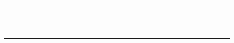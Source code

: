 \documentclass[10pt]{article}
\begin{document}
\begin{center}
\begin{tabular}{|c|c|c|c|c|c|c|c|c|c|c|c|c|c|c|c|c|c|c|c|c|c|c|c|c|c|c|c|c|c|c|c|}
\hline
 &  &  &  &  &  &  &  &  &  &  &  &  &  &  &  &  &  &  &  &  &  &  &  &  &  &  &  &  &  &  &  \\
\hline
 &  &  &  &  &  &  &  &  &  &  &  &  &  &  &  &  &  &  &  &  &  &  &  &  &  &  &  &  &  &  &  \\
\hline
 &  &  &  &  &  &  &  &  &  &  &  &  &  &  &  &  &  &  &  &  &  &  &  &  &  &  &  &  &  &  &  \\
\hline
 &  &  &  &  &  &  &  &  &  &  &  &  &  &  &  &  &  &  &  &  &  &  &  &  &  &  &  &  &  &  &  \\
\hline
 &  &  &  &  &  &  &  &  &  &  &  &  &  &  &  &  &  &  &  &  &  &  &  &  &  &  &  &  &  &  &  \\
\hline
 &  &  &  &  &  &  &  &  &  &  &  &  &  &  &  &  &  &  &  &  &  &  &  &  &  &  &  &  &  &  &  \\
\hline
 &  &  &  &  &  &  &  &  &  &  &  &  &  &  &  &  &  &  &  &  &  &  &  &  &  &  &  &  &  &  &  \\
\hline
 &  &  &  &  &  &  &  &  &  &  &  &  &  &  &  &  &  &  &  &  &  &  &  &  &  &  &  &  &  &  &  \\
\hline
 &  &  &  &  &  &  &  &  &  &  &  &  &  &  &  &  &  &  &  &  &  &  &  &  &  &  &  &  &  &  &  \\
\hline
 &  &  &  &  &  &  &  &  &  &  &  &  &  &  &  &  &  &  &  &  &  &  &  &  &  &  &  &  &  &  &  \\
\hline
 &  &  &  &  &  &  &  &  &  &  &  &  &  &  &  &  &  &  &  &  &  &  &  &  &  &  &  &  &  &  &  \\
\hline
 &  &  &  &  &  &  &  &  &  &  &  &  &  &  &  &  &  &  &  &  &  &  &  &  &  &  &  &  &  &  &  \\
\hline
 &  &  &  &  &  &  &  &  &  &  &  &  &  &  &  &  &  &  &  &  &  &  &  &  &  &  &  &  &  &  &  \\
\hline
 &  &  &  &  &  &  &  &  &  &  &  &  &  &  &  &  &  &  &  &  &  &  &  &  &  &  &  &  &  &  &  \\
\hline

\end{tabular}
\end{center}
\end{document}
